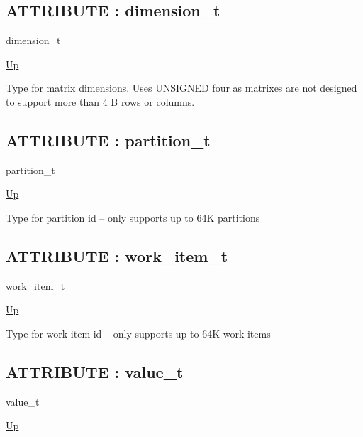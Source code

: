\subsection*{ATTRIBUTE : dimension\_t}
\hypertarget{ecldoc:pbblas.types.dimension_t}{}
\begin{minipage}[t]{\textwidth}
\begin{flushleft}
 dimension\_t 
\end{flushleft}
\end{minipage}
\hyperlink{ecldoc:PBblas.Types}{Up}

\par
Type for matrix dimensions. Uses UNSIGNED four as matrixes are not designed to support more than 4 B rows or columns.
\par
\subsection*{ATTRIBUTE : partition\_t}
\hypertarget{ecldoc:pbblas.types.partition_t}{}
\begin{minipage}[t]{\textwidth}
\begin{flushleft}
 partition\_t 
\end{flushleft}
\end{minipage}
\hyperlink{ecldoc:PBblas.Types}{Up}

\par
Type for partition id -- only supports up to 64K partitions
\par
\subsection*{ATTRIBUTE : work\_item\_t}
\hypertarget{ecldoc:pbblas.types.work_item_t}{}
\begin{minipage}[t]{\textwidth}
\begin{flushleft}
 work\_item\_t 
\end{flushleft}
\end{minipage}
\hyperlink{ecldoc:PBblas.Types}{Up}

\par
Type for work-item id -- only supports up to 64K work items
\par
\subsection*{ATTRIBUTE : value\_t}
\hypertarget{ecldoc:pbblas.types.value_t}{}
\begin{minipage}[t]{\textwidth}
\begin{flushleft}
 value\_t 
\end{flushleft}
\end{minipage}
\hyperlink{ecldoc:PBblas.Types}{Up}

